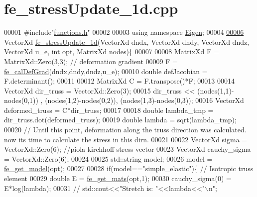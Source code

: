 \hypertarget{fe__stress_update__1d_8cpp_source}{}\section{fe\+\_\+stress\+Update\+\_\+1d.\+cpp}
\label{fe__stress_update__1d_8cpp_source}

\begin{DoxyCode}
00001 \textcolor{preprocessor}{#include"\hyperlink{functions_8h}{functions.h}"}
00002 
00003 \textcolor{keyword}{using namespace }\hyperlink{namespace_eigen}{Eigen};
00004 
\hyperlink{fe__stress_update__1d_8cpp_a94c1b672863e28bc2c70d08726939929}{00006} VectorXd \hyperlink{fe__stress_update__1d_8cpp_a94c1b672863e28bc2c70d08726939929}{fe\_stressUpdate\_1d}(VectorXd dndx, VectorXd dndy, VectorXd dndz, VectorXd u\_e, \textcolor{keywordtype}{
      int} opt, MatrixXd nodes)\{
00007 
00008     MatrixXd F = MatrixXd::Zero(3,3); \textcolor{comment}{// deformation gradient}
00009     F = \hyperlink{functions_8h_ae50379f74802347e04dbc022897f9cb0}{fe\_calDefGrad}(dndx,dndy,dndz,u\_e);
00010     \textcolor{keywordtype}{double} defJacobian = F.determinant();
00011 
00012     MatrixXd C = F.transpose()*F;
00013 
00014     VectorXd dir\_truss = VectorXd::Zero(3);
00015     dir\_truss << (nodes(1,1)-nodes(0,1)) , (nodes(1,2)-nodes(0,2)), (nodes(1,3)-nodes(0,3));
00016     VectorXd deformed\_truss = C*dir\_truss;
00017 
00018     \textcolor{keywordtype}{double} lambda\_tmp = dir\_truss.dot(deformed\_truss);
00019     \textcolor{keywordtype}{double} lambda = sqrt(lambda\_tmp);
00020     \textcolor{comment}{// Until this point, deformation along the truss direction was calculated. now its time to calculate
       the stress in this dirn.}
00021 
00022     VectorXd sigma = VectorXd::Zero(6); \textcolor{comment}{//piola-kirchhoff stress-vector}
00023     VectorXd cauchy\_sigma = VectorXd::Zero(6);
00024 
00025     std::string model;
00026     model = \hyperlink{functions_8h_a34d6fb85943d945b7e8600d2ef4220d0}{fe\_get\_model}(opt);
00027 
00028     \textcolor{keywordflow}{if}(model==\textcolor{stringliteral}{"simple\_elastic"})\{ \textcolor{comment}{// Isotropic truss element}
00029         \textcolor{keywordtype}{double} E = \hyperlink{functions_8h_af7ffbad6dfcc99fc88b130c1a7b1720a}{fe\_get\_mats}(opt,1);
00030         cauchy\_sigma(0) = E*log(lambda);
00031         \textcolor{comment}{// std::cout<<"Stretch is: "<<lambda<<"\(\backslash\)n";}

\end{DoxyCode}
